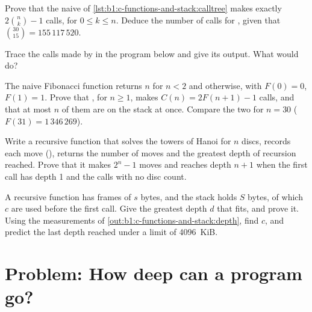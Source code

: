 \begin{exercise}[$\star\star$]\label{exo:b1:c-functions-and-stack:8}
Prove that the naive  of \cref{lst:b1:c-functions-and-stack:calltree} makes exactly
$2\binom{n}{k} - 1$ calls, for $0 \leq k \leq n$. Deduce the number of calls for , given that
$\binom{30}{15} = 155\,117\,520$.
\end{exercise}

\begin{exercise}[$\star\star$]\label{exo:b1:c-functions-and-stack:9}
Trace the calls made by  in the program below and give its output. What would  do?
\end{exercise}

\begin{exercise}[$\star\star\star$]\label{exo:b1:c-functions-and-stack:10}
The naive Fibonacci function returns $n$ for $n < 2$ and  otherwise, with $F(0) = 0$,
$F(1) = 1$. Prove that , for $n \geq 1$, makes $C(n) = 2F(n+1) - 1$ calls, and that at most $n$ of
them are on the stack at once. Compare the two for $n = 30$ ($F(31) = 1\,346\,269$).
\end{exercise}

\begin{exercise}[$\star\star\star$]\label{exo:b1:c-functions-and-stack:11}
Write a recursive function that solves the towers of Hanoi for $n$ discs, records each move (), returns
the number of moves and the greatest depth of recursion reached. Prove that it makes $2^n - 1$ moves and reaches
depth $n + 1$ when the first call has depth 1 and the calls with no disc count.
\end{exercise}

\begin{exercise}[$\star\star\star$]\label{exo:b1:c-functions-and-stack:12}
A recursive function has frames of $s$ bytes, and the stack holds $S$ bytes, of which $c$ are used before the first
call. Give the greatest depth $d$ that fits, and prove it. Using the measurements of
\cref{out:b1:c-functions-and-stack:depth}, find $c$, and predict the last depth reached under a limit of 4096~KiB.
\end{exercise}

\section{Problem: How deep can a program go?}\label{sec:b1:c-functions-and-stack:problem}

